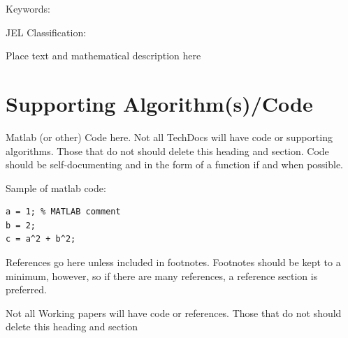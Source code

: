 
 


\titleRRITD %



\newpage
{}
\maketitle
\thispagestyle{empty}

\begin{abstract}  
Click here to enter a concise, 1-2 sentence description
\end{abstract}
Keywords: \keywords

JEL Classification: \JELCODES

\newpage
Place text and mathematical description here \cite{Figueredo:2009dg} 


\section*{Supporting Algorithm(s)/Code}

Matlab (or other) Code here.  Not all TechDocs will have code or supporting algorithms. Those that do not should delete this heading and section.  Code should be self-documenting and in the form of a function if and when possible.



Sample of matlab code: %
\begin{lstlisting} 
a = 1; % MATLAB comment 
b = 2; 
c = a^2 + b^2; 
\end{lstlisting} 






References go here unless included in footnotes.  Footnotes should be kept to a minimum, however, so if there are many references, a reference section is preferred.  

Not all Working papers will have code or references. Those that do not should delete this heading and section


